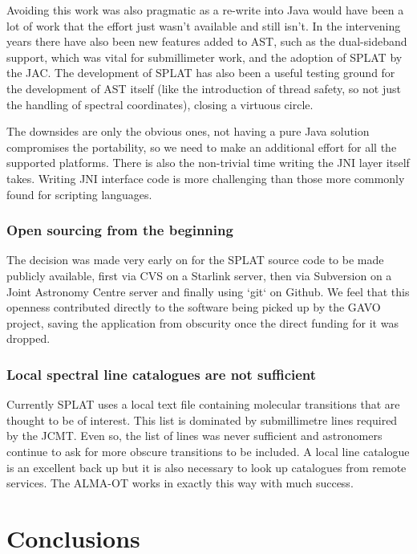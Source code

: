 \documentclass[final,authoryear,5p,times,twocolumn]{elsarticle}
\begin{document}
Avoiding this work was also pragmatic as a re-write into Java would
have been a lot of work that the effort just wasn't available and
still isn't. In the intervening years there have also been new
features added to AST, such as the dual-sideband support, which was
vital for submillimeter work, and the adoption of SPLAT by the
JAC. The development of SPLAT has also been a useful testing ground
for the development of AST itself (like the introduction of thread
safety, so not just the handling of spectral coordinates), closing a
virtuous circle.

The downsides are only the obvious ones, not having a pure Java
solution compromises the portability, so we need to make an additional
effort for all the supported platforms. There is also the non-trivial
time writing the JNI layer itself takes. Writing JNI interface code is
more challenging than those more commonly found for scripting
languages.

\subsubsection{Open sourcing from the beginning}

The decision was made very early on for the SPLAT source code to be
made publicly available, first via CVS on a Starlink server, then via
Subversion on a Joint Astronomy Centre server and finally using `git`
on Github. We feel that this openness contributed directly to the
software being picked up by the GAVO project, saving the application
from obscurity once the direct funding for it was dropped.

\subsubsection{Local spectral line catalogues are not sufficient}

Currently SPLAT uses a local text file containing molecular
transitions that are thought to be of interest. This list is dominated
by submillimetre lines required by the JCMT. Even so, the list of
lines was never sufficient and astronomers continue to ask for more
obscure transitions to be included. A local line catalogue is an
excellent back up but it is also necessary to look up catalogues from
remote services. The ALMA-OT \citep{2013ASPC..475..373W} works in
exactly this way with much success.

\section{Conclusions}
\end{document}
